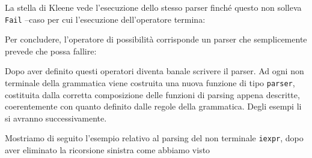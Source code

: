 \documentclass[12pt,a4paper]{report}
\begin{document}
La stella di Kleene vede l'esecuzione dello stesso parser finché questo
non solleva \texttt{Fail} --caso per cui l'esecuzione dell'operatore
termina:

\begin{Shaded}
\begin{Highlighting}[]
\NormalTok{ =}
   
\end{Highlighting}
\end{Shaded}

Per concludere, l'operatore di possibilità corrisponde un parser che
semplicemente prevede che possa fallire:

\begin{Shaded}
\begin{Highlighting}[]
  \NormalTok{ =}
\end{Highlighting}
\end{Shaded}

Dopo aver definito questi operatori diventa banale scrivere il parser.
Ad ogni non terminale della grammatica viene costruita una nuova
funzione di tipo \texttt{parser}, costituita dalla corretta composizione
delle funzioni di parsing appena descritte, coerentemente con quanto
definito dalle regole della grammatica. Degli esempi li si avranno
successivamente.

Mostriamo di seguito l'esempio relativo al parsing del non terminale
\texttt{iexpr}, dopo aver eliminato la ricorsione sinistra come abbiamo
visto
\end{document}
